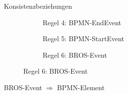 \begin{frame}{Konsistenzbeziehungen}
\begin{figure}
\begin{subfigure}{0.3\textwidth}
      \centering
      \begin{adjustbox}{width=0.8\linewidth,center}
      \end{adjustbox}
      \caption*{\tiny{\textcolor{black!20}{Regel 4: BPMN-EndEvent}}}%
    \end{subfigure}
    \hfill
    \begin{subfigure}{0.3\textwidth}
      \vspace{4pt}
      \centering
      \begin{adjustbox}{width=0.8\linewidth,center}
      \end{adjustbox}
      \caption*{\tiny{\textcolor{black!20}{Regel 5: BPMN-StartEvent}}}%
    \end{subfigure}
    \hfill
    \begin{subfigure}{0.3\textwidth}
      \vspace{4pt}
      \centering
      \begin{adjustbox}{width=0.8\linewidth,center}
      \end{adjustbox}
      \caption*{\tiny{Regel 6: BROS-Event}}%
    \end{subfigure}
  \end{figure}
\end{frame}

\begin{frame}{BROS-Event $\Rightarrow$ BPMN-Element}
    \begin{figure}
      \centering
      \begin{adjustbox}{width=0.5\linewidth,center}
        
      \end{adjustbox}
    \end{figure}
\end{frame}

